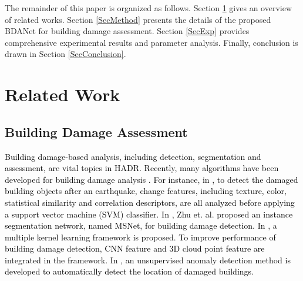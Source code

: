 \documentclass[journal]{IEEEtran}
\begin{document}
The remainder of this paper is organized as follows. Section \ref{SecRelatedWork} gives an overview of related works.  Section \ref{SecMethod} presents the details of the proposed BDANet for building damage assessment. Section \ref{SecExp} provides comprehensive experimental results and parameter analysis. Finally, conclusion is drawn in Section \ref{SecConclusion}.



\section{Related Work}
\label{SecRelatedWork}
\subsection{Building Damage Assessment}
\textcolor{black}{Building damage-based analysis, including detection, segmentation and assessment, are vital topics in HADR. Recently, many algorithms have been developed for building damage analysis \cite{dongComprehensiveReviewEarthquakeinduced2013,anniballeEarthquakeDamageMapping2018,kalantarAssessmentConvolutionalNeural2020}. For instance, in \cite{anniballeEarthquakeDamageMapping2018}, to detect the damaged building objects after an earthquake, change features, including texture, color, statistical similarity and correlation descriptors, are all analyzed before applying a support vector machine (SVM) classifier.
In \cite{Zhu_2021_WACV}, Zhu et. al. proposed an instance segmentation network, named MSNet, for building damage detection. In \cite{vetrivelDisasterDamageDetection2018}, a multiple kernel learning framework is proposed. To improve performance of building damage detection,  CNN feature and 3D cloud point feature are integrated in the framework. In \cite{tilonPostDisasterBuildingDamage2020}, an unsupervised anomaly detection method is developed to automatically detect the location of damaged buildings.}   
\end{document}
